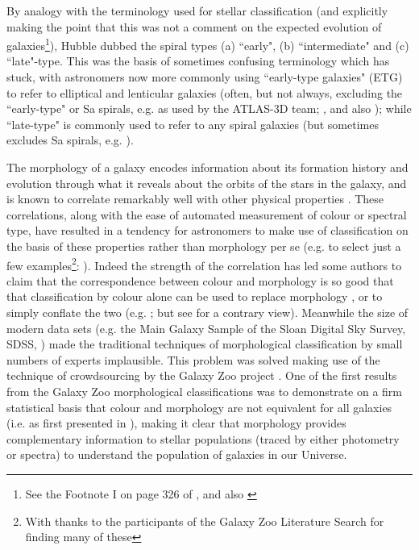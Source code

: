 \documentclass[usenatbib]{mn2e}
\begin{document}
By analogy with the terminology used for stellar classification (and explicitly making the point that this was not a comment on the expected evolution of galaxies\footnote{See the Footnote I on page 326 of \citet{Hubble1926}, and also \citet{Baldry2008AG}}), Hubble dubbed the spiral types (a) ``early",  (b) ``intermediate" and (c) ``late"-type. This was the basis of sometimes confusing terminology which has stuck, with astronomers now more commonly using ``early-type galaxies"  (ETG) to refer to elliptical and lenticular galaxies (often, but not always, excluding the ``early-type" or Sa spirals, e.g. as used by the ATLAS-3D team; \citealt{2011MNRAS.413..813C,2011MNRAS.416.1680C}, and also \citealt{Stanford1998}); while ``late-type" is commonly used to refer to any spiral galaxies (but sometimes excludes Sa spirals, e.g. \citealt{Strateva2001}).

The morphology of a galaxy encodes information about its formation history and evolution through what it reveals about the orbits of the stars in the galaxy, and is known to correlate remarkably well with other physical properties \citep[e.g. star formation rate, gas content, stellar mass][]{RobertsHaynes1994, Kennicutt1998, Strateva2001}. These correlations, along with the ease of automated measurement of colour or spectral type, have resulted in a tendency for astronomers to make use of classification on the basis of these properties rather than morphology per se (e.g. to select just a few examples\footnote{With thanks to the participants of the Galaxy Zoo Literature Search for finding many of these}: \citealt{Bell2004, Weinmann2006, vandenBosch2008, Cooper2010, Zehavi2011}). Indeed the strength of the correlation has led some authors to claim that the correspondence between colour and morphology is so good that that classification by colour alone can be used to replace morphology \citep[e.g.][]{ParkChoi2005, Faber2007, AscasibarAlmeida2011}, or to simply conflate the two (e.g. \citealt{TalvanDokkum2011}; but see \citealt{vandenBergh2007} for a contrary view). Meanwhile the size of modern data sets (e.g. the Main Galaxy Sample of the Sloan Digital Sky Survey, SDSS, \citealt{Strauss2002}) made the traditional techniques of morphological classification by small numbers of experts implausible. This problem was solved making use of the technique of crowdsourcing by the Galaxy Zoo project \citep{Lintott2008,Lintott2011}. One of the first results from the Galaxy Zoo morphological classifications was to demonstrate on a firm statistical basis that colour and morphology are not equivalent for all galaxies (i.e. as first presented in \citealt{Bamford2009, Schawinski2009,Masters2010}), making it clear that morphology provides complementary information to stellar populations (traced by either photometry or spectra) to understand the population of galaxies in our Universe.   
\end{document}
